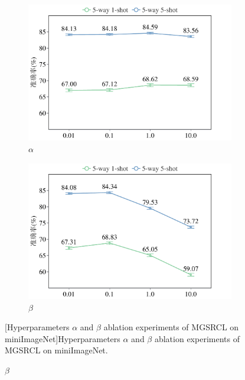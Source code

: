 \begin{figure}[h!]
\centering
{}
\begin{subfigure}{0.495\columnwidth}
\includegraphics[width=\columnwidth]{figures/MGSRCL/miniImageNet/alpha.pdf}
\caption{$\alpha$}
\label{figure3: alpha(mini)}
\end{subfigure}
\begin{subfigure}{0.495\columnwidth}
\includegraphics[width=\columnwidth]{figures/MGSRCL/miniImageNet/beta.pdf}
\caption{$\beta$}
\label{figure3: beta(mini)}
\end{subfigure}
[Hyperparameters $\alpha$ and $\beta$ ablation experiments of MGSRCL on miniImageNet]{Hyperparameters $\alpha$ and $\beta$ ablation experiments of MGSRCL on miniImageNet.}
\label{figure3: alpha and beta (mini)}
\end{figure}


